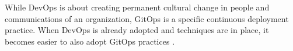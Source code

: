 While DevOps is about creating permanent cultural change in people
and communications of an organization,
GitOps is a specific continuous deployment practice.
When DevOps is already adopted and techniques are in place,
it becomes easier to also adopt GitOps practices
\autocite{gitopsCloudnativeCDInnoq}.





%
%
%
%
%

